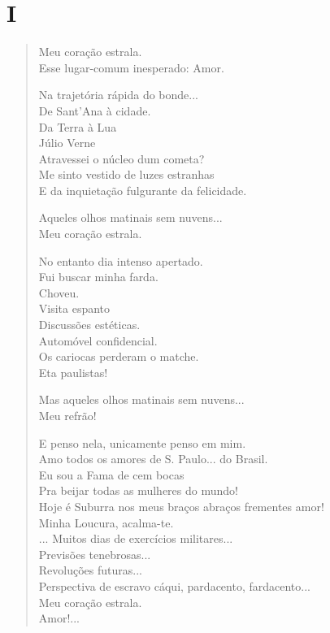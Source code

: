 \chapter[I -- ``Meu coração estrala.'']{I}

\begin{verse}
Meu coração estrala.\\
Esse lugar-comum inesperado: Amor.

\quad\quad\quad{}Na trajetória rápida do bonde...\\
\quad\quad\quad\quad{}De Sant'Ana à cidade.\\
\quad\quad\quad\quad\quad{}Da Terra à Lua\\
\quad\quad\quad\quad\quad\quad{}Júlio Verne\\
\quad\quad\quad\quad\quad{}Atravessei o núcleo dum cometa?\\
\quad\quad\quad\quad{}Me sinto vestido de luzes estranhas\\
\quad\quad\quad\quad{}E da inquietação fulgurante da felicidade.

Aqueles olhos matinais sem nuvens...\\
Meu coração estrala.

No entanto dia intenso apertado.\\
\quad\quad\quad\quad{}Fui buscar minha farda.\\
\quad\quad\quad\quad{}Choveu.\\
\quad\quad\quad\quad{}Visita espanto\\
\quad\quad\quad\quad{}Discussões estéticas.\\
\quad\quad\quad\quad{}Automóvel confidencial.\\
\quad\quad\quad\quad{}Os cariocas perderam o matche.\\
\quad\quad\quad\quad{}Eta paulistas!

Mas aqueles olhos matinais sem nuvens...\\
Meu refrão!

E penso nela, unicamente penso em mim.\\
Amo todos os amores de S. Paulo... do Brasil.\\
Eu sou a Fama de cem bocas\\
Pra beijar todas as mulheres do mundo!\\
Hoje é Suburra nos meus braços abraços frementes amor!\\
Minha Loucura, acalma-te.\\
... Muitos dias de exercícios militares...\\
\quad\quad\quad\quad{}Previsões tenebrosas...\\
\quad\quad\quad\quad\quad\quad{}Revoluções futuras...\\
Perspectiva de escravo cáqui, pardacento, fardacento...\\

Meu coração estrala.\\
Amor!...
\end{verse}


